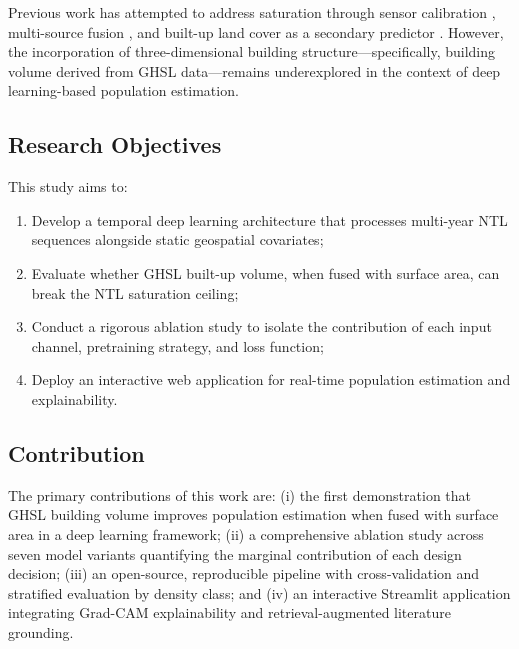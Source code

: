 \documentclass[conference]{IEEEtran}
\begin{document}
Previous work has attempted to address saturation through sensor calibration \cite{li2014syria}, multi-source fusion \cite{foody1998sharpening}, and built-up land cover as a secondary predictor \cite{linard2013improving}. However, the incorporation of three-dimensional building structure---specifically, building volume derived from GHSL data---remains underexplored in the context of deep learning-based population estimation.

\subsection{Research Objectives}
\label{subsec:objectives}

This study aims to:

\begin{enumerate}
    \item Develop a temporal deep learning architecture that processes multi-year NTL sequences alongside static geospatial covariates;
    \item Evaluate whether GHSL built-up volume, when fused with surface area, can break the NTL saturation ceiling;
    \item Conduct a rigorous ablation study to isolate the contribution of each input channel, pretraining strategy, and loss function;
    \item Deploy an interactive web application for real-time population estimation and explainability.
\end{enumerate}

\subsection{Contribution}
\label{subsec:contribution}

The primary contributions of this work are: (i) the first demonstration that GHSL building volume improves population estimation when fused with surface area in a deep learning framework; (ii) a comprehensive ablation study across seven model variants quantifying the marginal contribution of each design decision; (iii) an open-source, reproducible pipeline with cross-validation and stratified evaluation by density class; and (iv) an interactive Streamlit application integrating Grad-CAM explainability and retrieval-augmented literature grounding.

\end{document}
